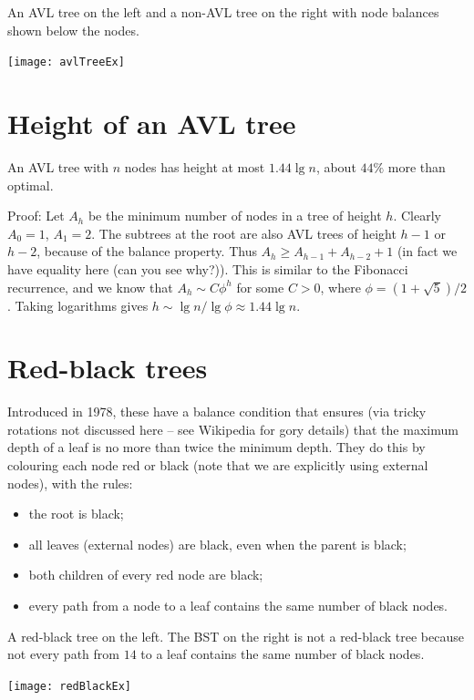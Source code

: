 \begin{Boxample} \label{ex:avlTreeEx}
An AVL tree on the left and a non-AVL tree on the right with node balances shown below the nodes.
\begin{center}
  \texttt{[image: avlTreeEx]}
\end{center}
\end{Boxample}

\section{Height of an AVL tree}
\begin{Boxample}
An AVL tree with $n$ nodes has height at most $1.44 \lg n$, about $44\%$ more 
than optimal.

Proof: Let $A_h$ be the minimum number of nodes in a tree of height $h$. 
Clearly $A_0 = 1$, $A_1 = 2$. 
The subtrees at the root are also AVL trees of height $h-1$ or $h-2$, because of the balance property. 
Thus $A_h \geq A_{h-1} + A_{h-2} + 1$ (in fact we have equality here (can you see why?)). 
This is similar to the Fibonacci recurrence, and we know that 
$A_h \sim C \phi^h$ for some $C>0$, where $\phi = (1+\sqrt{5})/2$. 
Taking logarithms gives $h \sim \lg n / \lg \phi \approx 1.44 \lg n$. 
\end{Boxample}

\section{Red-black trees}
Introduced in 1978, these have a balance condition that ensures (via tricky rotations not discussed here -- see Wikipedia for gory details) 
that the maximum depth of a leaf is no more than twice the minimum depth. 
They do this by colouring each node red or black (note that we are explicitly using external nodes), with the rules:
\begin{itemize}
\item the root is black;
\item all leaves (external nodes) are black, even when the parent is black;
\item both children of every red node are black;
\item every path from a node to a leaf contains the same number of black nodes.
\end{itemize}

\begin{Boxample} \label{ex:redblackTreeEx}
A red-black tree on the left. The BST on the right is not a red-black tree 
  because not every path from $14$ to a leaf contains the same number of black nodes.
\begin{center}
  \texttt{[image: redBlackEx]}
\end{center}
\end{Boxample}

